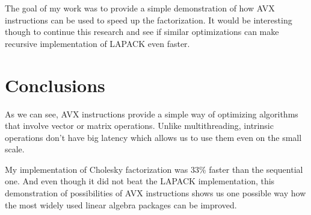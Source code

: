 \documentclass[sigplan]{acmart}
\begin{document}
The goal of my work was to provide a simple demonstration of how AVX instructions can be used to speed up the factorization. It would be interesting though to continue this research and see if similar optimizations can make recursive implementation of LAPACK even faster.

\section{Conclusions}

As we can see, AVX instructions provide a simple way of optimizing algorithms that involve vector or matrix operations. Unlike multithreading, intrinsic operations don't have big latency which allows us to use them even on the small scale.

My implementation of Cholesky factorization was $33\%$ faster than the sequential one. And even though it did not beat the LAPACK implementation, this demonstration of possibilities of AVX instructions shows us one possible way how the most widely used linear algebra packages can be improved.



\end{document}
